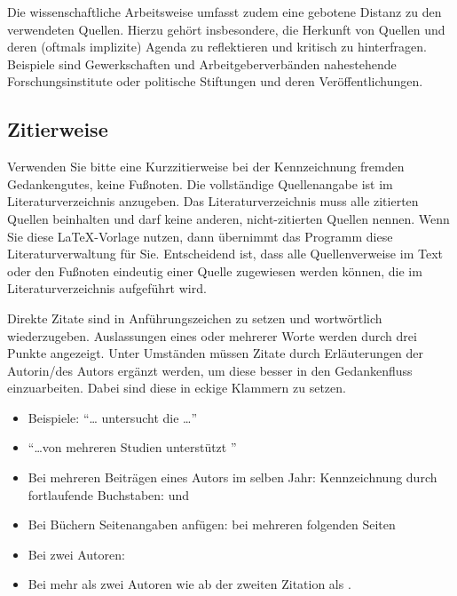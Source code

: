 \documentclass[a4paper,12pt]{scrartcl} %
\begin{document}
Die wissenschaftliche Arbeitsweise umfasst zudem eine gebotene Distanz zu den verwendeten Quellen. Hierzu gehört insbesondere, die Herkunft von Quellen und deren (oftmals implizite) Agenda zu reflektieren und kritisch zu hinterfragen. Beispiele sind Gewerkschaften und Arbeitgeberverbänden nahestehende Forschungsinstitute oder politische Stiftungen und deren Veröffentlichungen.

\subsection{Zitierweise}

Verwenden Sie bitte eine Kurzzitierweise bei der Kennzeichnung fremden Gedankengutes, keine Fußnoten. Die vollständige Quellenangabe ist im Literaturverzeichnis anzugeben. Das Literaturverzeichnis muss alle zitierten Quellen beinhalten und darf keine anderen, nicht-zitierten Quellen nennen. Wenn Sie diese \LaTeX-Vorlage nutzen, dann übernimmt das Programm diese Literaturverwaltung für Sie.  Entscheidend ist, dass alle Quellenverweise im Text oder den Fußnoten eindeutig einer Quelle zugewiesen werden können, die im Literaturverzeichnis aufgeführt wird.

Direkte Zitate sind in Anführungszeichen zu setzen und wortwörtlich wiederzugeben. Auslassungen eines oder mehrerer Worte werden durch drei Punkte angezeigt. Unter Umständen müssen Zitate durch Erläuterungen der Autorin/des Autors ergänzt werden, um diese besser in den Gedankenfluss einzuarbeiten. Dabei sind diese in eckige Klammern zu setzen.


\begin{itemize}
  \item Beispiele: ``\ldots \textcite{Solow1979} untersucht die \ldots''
  \item ``\ldots  von mehreren Studien unterstützt \parencite[][]{Solow1979,Yellen1984}''
  \item Bei mehreren Beiträgen eines Autors im selben Jahr: Kennzeichnung durch
        fortlaufende Buchstaben: \textcite{SGU2004JET} und \textcite{SGU2004}
   \item  Bei Büchern Seitenangaben anfügen: \textcite[][99]{Gali2015book} \textcite[][99\psq]{Gali2015book} \textcite[][99\psqq]{Gali2015book} bei mehreren folgenden Seiten
\item  Bei zwei Autoren: \textcite{SGU2004}
\item  Bei mehr als zwei Autoren wie \textcite{FernandezEtAl2007} ab der zweiten Zitation als \textcite{FernandezEtAl2007}.
\end{itemize}
\end{document}
